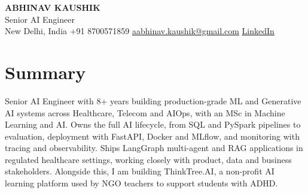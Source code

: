 \documentclass[10pt,a4paper]{article}
\begin{document}
\begin{center}
  {\LARGE\bfseries ABHINAV KAUSHIK}\\[2pt]
  {\large Senior AI Engineer}\\[2pt]
  New Delhi, India \textbar{} +91 8700571859 \textbar{} \href{mailto:aabhinav.kaushik@gmail.com}{aabhinav.kaushik@gmail.com} \textbar{} \href{https://www.linkedin.com/in/abhinav-kaushik10/}{LinkedIn}  
\end{center}

\section{Summary}
Senior AI Engineer with 8+ years building production-grade ML and Generative AI systems across Healthcare, Telecom and AIOps, with an MSc in Machine Learning and AI. Owns the full AI lifecycle, from SQL and PySpark pipelines to evaluation, deployment with FastAPI, Docker and MLflow, and monitoring with tracing and observability. Ships LangGraph multi-agent and RAG applications in regulated healthcare settings, working closely with product, data and business stakeholders. Alongside this, I am building ThinkTree.AI, a non-profit AI learning platform used by NGO teachers to support students with ADHD.
\end{document}
